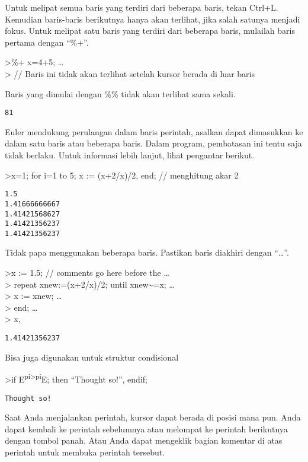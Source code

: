 \documentclass[
]{book}
\begin{document}
Untuk melipat semua baris yang terdiri dari beberapa baris, tekan Ctrl+L. Kemudian baris-baris berikutnya hanya akan terlihat, jika salah satunya menjadi fokus. Untuk melipat satu baris yang terdiri dari beberapa baris, mulailah baris pertama dengan ``\%+''.

\textgreater\%+ x=4+5; \ldots{}\\
\textgreater{} // Baris ini tidak akan terlihat setelah kursor berada di luar baris

Baris yang dimulai dengan \%\% tidak akan terlihat sama sekali.

\begin{verbatim}
81
\end{verbatim}

Euler mendukung perulangan dalam baris perintah, asalkan dapat dimasukkan ke dalam satu baris atau beberapa baris. Dalam program, pembatasan ini tentu saja tidak berlaku. Untuk informasi lebih lanjut, lihat pengantar berikut.

\textgreater x=1; for i=1 to 5; x := (x+2/x)/2, end; // menghitung akar 2

\begin{verbatim}
1.5
1.41666666667
1.41421568627
1.41421356237
1.41421356237
\end{verbatim}

Tidak papa menggunakan beberapa baris. Pastikan baris diakhiri dengan ``\ldots{}''.

\textgreater x := 1.5; // comments go here before the \ldots{}\\
\textgreater{} repeat xnew:=(x+2/x)/2; until xnew\textasciitilde=x; \ldots{}\\
\textgreater{} x := xnew; \ldots{}\\
\textgreater{} end; \ldots{}\\
\textgreater{} x,

\begin{verbatim}
1.41421356237
\end{verbatim}

Bisa juga digunakan untuk struktur condisional

\textgreater if E\textsuperscript{pi\textgreater pi}E; then ``Thought so!'', endif;

\begin{verbatim}
Thought so!
\end{verbatim}

Saat Anda menjalankan perintah, kursor dapat berada di posisi mana pun. Anda dapat kembali ke perintah sebelumnya atau melompat ke perintah berikutnya dengan tombol panah. Atau Anda dapat mengeklik bagian komentar di atas perintah untuk membuka perintah tersebut.
\end{document}
